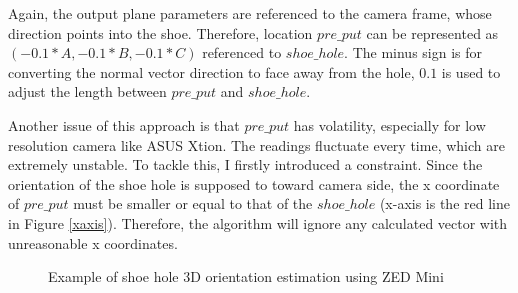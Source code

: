 Again, the output plane parameters are referenced to the camera frame, whose direction points into the shoe. Therefore, location $pre\_put$ can be represented as $(-0.1*A, -0.1*B, -0.1*C)$ referenced to $shoe\_hole$. The minus sign is for converting the normal vector direction to face away from the hole, $0.1$ is used to adjust the length between $pre\_put$ and $shoe\_hole$.

Another issue of this approach is that $pre\_put$ has volatility, especially for low resolution camera like ASUS Xtion. The readings fluctuate every time, which are extremely unstable. To tackle this, I firstly introduced a constraint. Since the orientation of the shoe hole is supposed to toward camera side, the x coordinate of $pre\_put$ must be smaller or equal to that of the $shoe\_hole$ (x-axis is the red line in Figure \ref{xaxis}). Therefore, the algorithm will ignore any calculated vector with unreasonable x coordinates. 

\begin{figure}[H]
\centering
{}
\caption{Example of shoe hole 3D orientation estimation using ZED Mini}
\end{figure}

